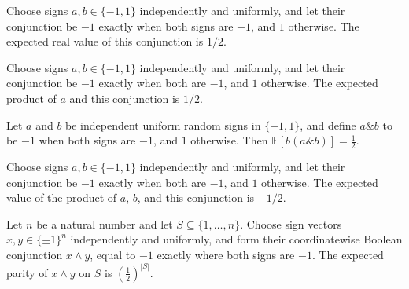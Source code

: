 \begin{theorem}
\label{FABL.expect_signAnd}
\leanok
{}
Choose signs $a,b\in\{−1,1\}$ independently and uniformly, and let their conjunction be
$-1$ exactly when both signs are $-1$, and $1$ otherwise. The expected real value of
this conjunction is $1/2$.
\end{theorem}

\begin{theorem}
\label{FABL.expect_signValue_mul_signAnd}
\leanok
{}
Choose signs $a,b\in\{−1,1\}$ independently and uniformly, and let their conjunction be
$-1$ exactly when both are $-1$, and $1$ otherwise. The expected product of $a$ and this
conjunction is $1/2$.
\end{theorem}

\begin{theorem}
\label{FABL.expect_signValue_second_mul_signAnd}
\leanok
{}
Let $a$ and $b$ be independent uniform random signs in $\{-1,1\}$, and define
$a\mathbin{\&}b$ to be $-1$ when both signs are $-1$, and $1$ otherwise. Then
$\mathbb{E}[b(a\mathbin{\&}b)]=\frac12$.
\end{theorem}

\begin{theorem}
\label{FABL.expect_signValue_mul_signValue_mul_signAnd}
\leanok
{}
Choose signs $a,b\in\{−1,1\}$ independently and uniformly, and let their conjunction be
$-1$ exactly when both are $-1$, and $1$ otherwise. The expected value of the product of
$a$, $b$, and this conjunction is $-1/2$.
\end{theorem}

\begin{theorem}
\label{FABL.expect_parity_signCubeAnd}
\leanok
{}
Let $n$ be a natural number and let $S\subseteq\{1,\ldots,n\}$. Choose sign vectors
$x,y\in\{\pm1\}^n$ independently and uniformly, and form their coordinatewise Boolean
conjunction $x\wedge y$, equal to $-1$ exactly where both signs are $-1$. The expected
parity of $x\wedge y$ on $S$ is $(\frac12)^{|S|}$.
\end{theorem}

